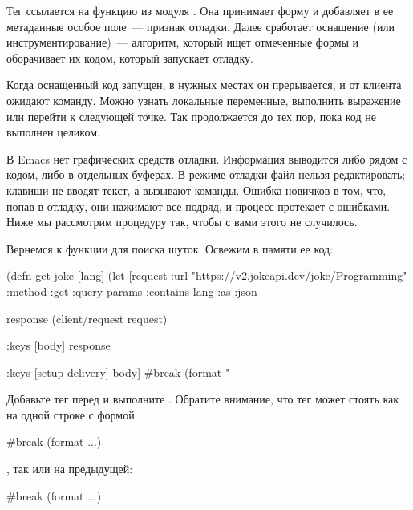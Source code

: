 Тег  ссылается на функцию  из модуля . Она принимает форму и добавляет в ее метаданные особое поле~--- признак отладки. Далее сработает оснащение (или инструментирование)~--- алгоритм, который ищет отмеченные формы и оборачивает их кодом, который запускает отладку.

Когда оснащенный код запущен, в нужных местах он прерывается, и от клиента ожидают команду. Можно узнать локальные переменные, выполнить выражение или перейти к следующей точке. Так продолжается до тех пор, пока код не выполнен целиком.

В Emacs нет графических средств отладки. Информация выводится либо рядом с кодом, либо в отдельных буферах. В режиме отладки файл нельзя редактировать; клавиши не вводят текст, а вызывают команды. Ошибка новичков в том, что, попав в отладку, они нажимают все подряд, и процесс протекает с ошибками. Ниже мы рассмотрим процедуру так, чтобы с вами этого не случилось.

Вернемся к функции  для поиска шуток. Освежим в памяти ее код:

\begin{english}
  \begin{clojure}
(defn get-joke [lang]
  (let [request
        {:url "https://v2.jokeapi.dev/joke/Programming"
         :method :get
         :query-params {:contains lang}
         :as :json}

        response
        (client/request request)

        {:keys [body]}
        response

        {:keys [setup delivery]}
        body]
    #break
    (format "%
  \end{clojure}
\end{english}

Добавьте тег  перед  и выполните . Обратите внимание, что тег может стоять как на одной строке с формой:

\begin{english}
  \begin{clojure}
#break (format ...)
  \end{clojure}
\end{english}

, так или на предыдущей:

\begin{english}
  \begin{clojure}
#break
(format ...)
  \end{clojure}
\end{english}

